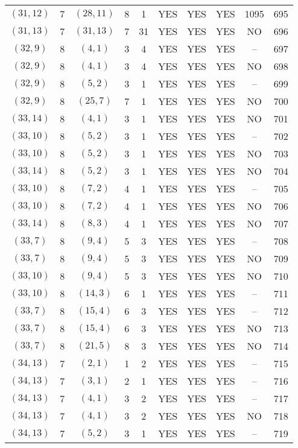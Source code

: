 \begin{longtable}{|c|c|c|c|c|c|c|c|c|c|}
$(31, 12)$ & 7 & $(28, 11)$ & 8 & 1 & YES & YES & YES & 1095 & 695\\
$(31, 13)$ & 7 & $(31, 13)$ & 7 & 31 & YES & YES & YES & NO & 696\\
$(32, 9)$ & 8 & $(4, 1)$ & 3 & 4 & YES & YES & YES & -- & 697\\
$(32, 9)$ & 8 & $(4, 1)$ & 3 & 4 & YES & YES & YES & NO & 698\\
$(32, 9)$ & 8 & $(5, 2)$ & 3 & 1 & YES & YES & YES & -- & 699\\
$(32, 9)$ & 8 & $(25, 7)$ & 7 & 1 & YES & YES & YES & NO & 700\\
$(33, 14)$ & 8 & $(4, 1)$ & 3 & 1 & YES & YES & YES & NO & 701\\
$(33, 10)$ & 8 & $(5, 2)$ & 3 & 1 & YES & YES & YES & -- & 702\\
$(33, 10)$ & 8 & $(5, 2)$ & 3 & 1 & YES & YES & YES & NO & 703\\
$(33, 14)$ & 8 & $(5, 2)$ & 3 & 1 & YES & YES & YES & NO & 704\\
$(33, 10)$ & 8 & $(7, 2)$ & 4 & 1 & YES & YES & YES & -- & 705\\
$(33, 10)$ & 8 & $(7, 2)$ & 4 & 1 & YES & YES & YES & NO & 706\\
$(33, 14)$ & 8 & $(8, 3)$ & 4 & 1 & YES & YES & YES & NO & 707\\
$(33, 7)$ & 8 & $(9, 4)$ & 5 & 3 & YES & YES & YES & -- & 708\\
$(33, 7)$ & 8 & $(9, 4)$ & 5 & 3 & YES & YES & YES & NO & 709\\
$(33, 10)$ & 8 & $(9, 4)$ & 5 & 3 & YES & YES & YES & NO & 710\\
$(33, 10)$ & 8 & $(14, 3)$ & 6 & 1 & YES & YES & YES & -- & 711\\
$(33, 7)$ & 8 & $(15, 4)$ & 6 & 3 & YES & YES & YES & -- & 712\\
$(33, 7)$ & 8 & $(15, 4)$ & 6 & 3 & YES & YES & YES & NO & 713\\
$(33, 7)$ & 8 & $(21, 5)$ & 8 & 3 & YES & YES & YES & NO & 714\\
$(34, 13)$ & 7 & $(2, 1)$ & 1 & 2 & YES & YES & YES & -- & 715\\
$(34, 13)$ & 7 & $(3, 1)$ & 2 & 1 & YES & YES & YES & -- & 716\\
$(34, 13)$ & 7 & $(4, 1)$ & 3 & 2 & YES & YES & YES & -- & 717\\
$(34, 13)$ & 7 & $(4, 1)$ & 3 & 2 & YES & YES & YES & NO & 718\\
$(34, 13)$ & 7 & $(5, 2)$ & 3 & 1 & YES & YES & YES & -- & 719\\

\end{longtable}

